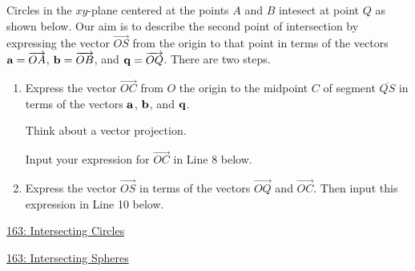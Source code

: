 \documentclass{ximera}
\begin{document}
\begin{question} \label{Q:74dsfretg4444}
Circles in the $xy$-plane centered at the points $A$ and $B$ intesect at point $Q$ as shown below. Our aim is to describe the second point of intersection by expressing the vector $\overrightarrow{OS}$ from the origin to that point in terms of the vectors ${\bf a} = \overrightarrow{OA}$, ${\bf b} = \overrightarrow{OB}$, and ${\bf q} = \overrightarrow{OQ}$. There are two steps.

\begin{enumerate}
\item Express the vector $\overrightarrow{OC}$ from $O$ the origin to the midpoint $C$ of segment $\overline{QS}$ in terms of the vectors ${\bf a}$, ${\bf b}$, and ${\bf q}$.
\begin{hint}
Think about a vector projection.
\end{hint}
Input your expression for $\overrightarrow{OC}$ in Line 8 below.


\item Express the vector $\overrightarrow{OS}$ in terms of the vectors $\overrightarrow{OQ}$ and $\overrightarrow{OC}$. Then input this expression in Line 10 below.

\end{enumerate}

\begin{onlineOnly}
    \begin{center}
\end{center}
\end{onlineOnly}

\href{https://www.desmos.com/3d/nttmyvnge7}{163: Intersecting Circles}
\end{question}



\begin{question} \label{Q:743rf4rtg4444}

\begin{onlineOnly}
    \begin{center}
\end{center}
\end{onlineOnly}

\href{https://www.desmos.com/3d/wftyxbvczm}{163: Intersecting Spheres}
\end{question}
\end{document}
